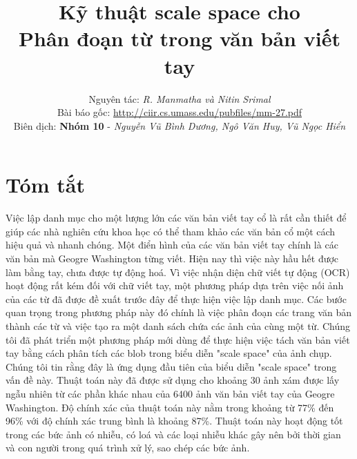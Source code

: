 \documentclass[a4paper]{article}
\title {
    Kỹ thuật scale space cho\\
    Phân đoạn từ trong văn bản viết tay
}
\author {
    Nguyên tác: \textit{R. Manmatha và Nitin Srimal}\\
    Bài báo gốc: \url{http://ciir.cs.umass.edu/pubfiles/mm-27.pdf}\\
    Biên dịch: \textbf{Nhóm 10} - \textit{Nguyễn Vũ Bình Dương, Ngô Văn Huy, Vũ Ngọc Hiển}
}
\begin{document}
\maketitle
\pagebreak

\tableofcontents
\pagebreak

\section*{Tóm tắt}
Việc lập danh mục cho một lượng lớn các văn bản viết tay cổ là rất cần thiết để giúp các nhà nghiên cứu khoa học có thể tham khảo các văn bản cổ một cách hiệu quả và nhanh chóng. Một điển hình của các văn bản viết tay chính là các văn bản mà Geogre Washington từng viết. Hiện nay thì việc này hầu hết được làm bằng tay, chưa được tự động hoá. Vì việc nhận diện chữ viết tự động (OCR) hoạt động rất kém đối với chữ viết tay, một phương pháp dựa trên việc nối ảnh của các từ đã được đề xuất trước đây để thực hiện việc lập danh mục. Các bước quan trọng trong phương pháp này đó chính là việc phân đoạn các trang văn bản thành các từ và việc tạo ra một danh sách chứa các ảnh của cùng một từ. Chúng tôi đã phát triển một phương pháp mới dùng để thực hiện việc tách văn bản viết tay bằng cách phân tích các blob trong biểu diễn "scale space" của ảnh chụp. Chúng tôi tin rằng đây là ứng dụng đầu tiên của biểu diễn "scale space" trong vấn đề này. Thuật toán này đã được sử dụng cho khoảng 30 ảnh xám được lấy ngẫu nhiên từ các phần khác nhau của 6400 ảnh văn bản viết tay của Geogre Washington. Độ chính xác của thuật toán này nằm trong khoảng từ 77\% đến 96\% với độ chính xác trung bình là khoảng 87\%. Thuật toán này hoạt động tốt trong các bức ảnh có nhiễu, có loá và các loại nhiễu khác gây nên bởi thời gian và con người trong quá trình xử lý, sao chép các bức ảnh.
\end{document}
